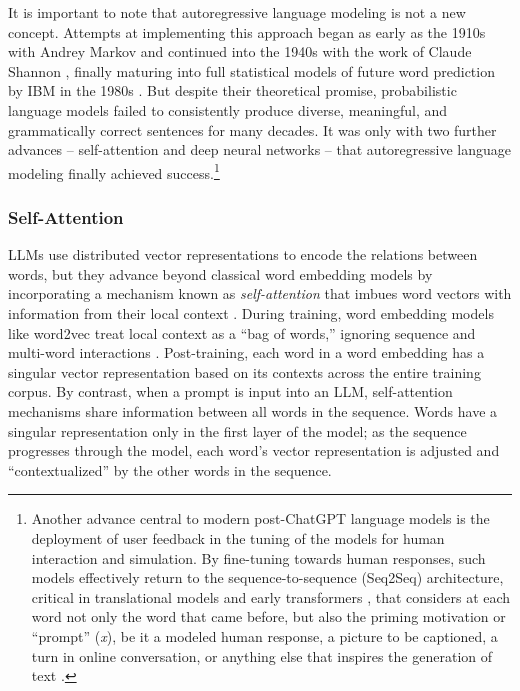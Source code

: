 \documentclass{article}
\begin{document}
It is important to note that autoregressive language modeling is not a
new concept. Attempts at implementing this approach began as early as
the 1910s with Andrey Markov
\parencite{Gagniuc2017-xm, Hayes2013-yb} and continued into the 1940s with the work of Claude Shannon
\parencite{Shannon1951-ct}, finally
maturing into full statistical models of future word prediction by IBM
in the 1980s \parencite{Rosenfeld2000-rq}. But despite their theoretical promise, probabilistic language
models failed to consistently produce diverse, meaningful, and
grammatically correct sentences for many decades. It was only with two
further advances -- self-attention and deep neural networks -- that
autoregressive language modeling finally achieved success.\footnote{Another
  advance central to modern post-ChatGPT language models is the
  deployment of user feedback in the tuning of the models for human
  interaction and simulation. By fine-tuning towards human responses,
  such models effectively return to the sequence-to-sequence (Seq2Seq)
  architecture, critical in translational models
  \parencite{Xue2020-qb} and
  early transformers \parencite{Vaswani2017-wi}, that considers at each word not only the word that came
  before, but also the priming motivation or ``prompt'' (\emph{x}), be
  it a modeled human response, a picture to be captioned, a turn in
  online conversation, or anything else that inspires the generation of
  text \parencite{Ouyang2022-xw}.}

\subsubsection*{Self-Attention}

LLMs use distributed vector representations to encode the relations
between words, but they advance beyond classical word embedding models
by incorporating a mechanism known as \emph{self-attention} that imbues
word vectors with information from their local context
\parencite{Vaswani2017-wi}.
During training, word embedding models like word2vec treat local context
as a ``bag of words,'' ignoring sequence and multi-word interactions
\parencite{Mikolov2013-va, Pennington2014-dz}. Post-training, each word in a word embedding
has a singular vector representation based on its contexts across the
entire training corpus. By contrast, when a prompt is input into an LLM,
self-attention mechanisms share information between all words in the
sequence. Words have a singular representation only in the first layer
of the model; as the sequence progresses through the model, each word's
vector representation is adjusted and ``contextualized'' by the other
words in the sequence.
\end{document}
